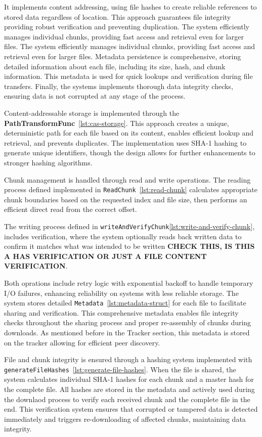 \documentclass[12pt,a4paper]{report}
\begin{document}
It implements content addressing, using file hashes to create reliable references to stored data regardless of location. This approach guarantees file integrity providing robust verification and preventing duplication. The system efficiently manages individual chunks, providing fast access and retrieval even for larger files. The system efficiently manages individual chunks, providing fast access and retrieval even for larger files. Metadata persistence is comprehensive, storing detailed information about each file, including its size, hash, and chunk information. This metadata is used for quick lookups and verification during file transfers. Finally, the systems implements thorough data integrity checks, ensuring data is not corrupted at any stage of the process.

Content-addressable storage is implemented through the \textbf{PathTransformFunc}~\ref{lst:cas-storage}. This approach creates a unique, deterministic path for each file based on its content, enables efficient lookup and retrieval, and prevents duplicates. The implementation uses SHA-1 hashing to generate unique identifiers, though the design allows for further enhancements to stronger hashing algorithms.

Chunk management is handled through read and write operations. The reading process defined implemented in \texttt{ReadChunk}~\ref{lst:read-chunk} calculates appropriate chunk boundaries based on the requested index and file size, then performs an efficient direct read from the correct offset.

The writing process defined in \texttt{writeAndVerifyChunk}\ref{lst:write-and-verify-chunk}, includes verification, where the system optionally reads back written data to confirm it matches what was intended to be written \textbf{CHECK THIS, IS THIS A HAS VERIFICATION OR JUST A FILE CONTENT VERIFICATION}.

Both oprations include retry logic with exponential backoff to handle temporary I/O failures, enhancing reliability on systems with less reliable storage. The system stores detailed \texttt{Metadata}~\ref{lst:metadata-struct} for each file to facilitate sharing and verification. This comprehensive metadata enables file integrity checks throughout the sharing process and proper re-assembly of chunks during downloads. As mentioned before in the Tracker section, this metadata is stored on the tracker allowing for efficient peer discovery.

File and chunk integrity is ensured through a hashing system implemented with \texttt{generateFileHashes}~\ref{lst:generate-file-hashes}. When the file is shared, the system calculates individual SHA-1 hashes for each chunk and a master hash for the complete file. All hashes are stored in the metadata and actively used during the downlaod process to verify each received chunk and the complete file in the end. This verification system ensures that corrupted or tampered data is detected immediately and triggers re-downloading of affected chunks, maintaining data integrity.
\end{document}

